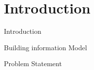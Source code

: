 \section
  {Introduction}

\begin{frame}
  {Introduction}
\end{frame}

\begin{frame}
  {Building information Model}
\end{frame}
\begin{frame}
  {Problem Statement}
\end{frame}

